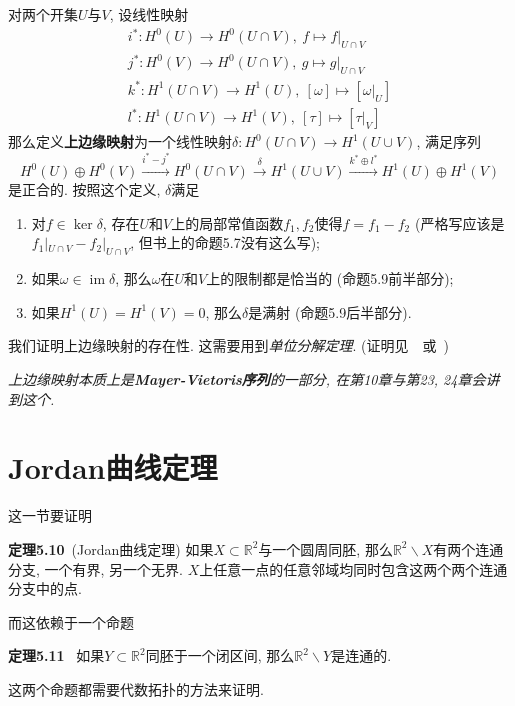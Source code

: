 \documentclass[11pt]{article}
\theoremstyle{definition}\newtheorem*{analyse}{分析}
\theoremstyle{remark}\newtheorem{rem*}{评注}
\newenvironment{env}[1]{\par\vspace{1em}\noindent\textbf{#1}\ }{\par\vspace{1em}}
\DeclareMathOperator{\im}{im}
\begin{document}
对两个开集$U$与$V$, 设线性映射
\begin{gather*}
    i^*:H^0(U)\to H^0(U\cap V),\ f\mapsto f|_{U\cap V}\\
    j^*:H^0(V)\to H^0(U\cap V),\ g\mapsto g|_{U\cap V}\\
    k^*:H^1(U\cap V)\to H^1(U),\ [\omega]\mapsto[\omega|_U]\\
    l^*:H^1(U\cap V)\to H^1(V),\ [\tau]\mapsto[\tau|_V]
\end{gather*}
那么定义\textbf{上边缘映射}为一个线性映射$\delta:H^0(U\cap V)\to H^1(U\cup V)$, 满足序列
\begin{equation}
    H^0(U)\oplus H^0(V)\xrightarrow{i^*-j^*}H^0(U\cap V)\xrightarrow{\delta}H^1(U\cup V)\xrightarrow{k^*\oplus l^*}H^1(U)\oplus H^1(V)
    \label{mayer-vietoris}
\end{equation}
是正合的.
按照这个定义, $\delta$满足
\begin{enumerate}
    \item 对$f\in\ker\delta$, 存在$U$和$V$上的局部常值函数$f_1,f_2$使得$f=f_1-f_2$ (严格写应该是$f_1|_{U\cap V}-f_2|_{U\cap V}$, 但书上的命题5.7没有这么写);
    \item 如果$\omega\in\im\delta$, 那么$\omega$在$U$和$V$上的限制都是恰当的 (命题5.9前半部分);
    \item 如果$H^1(U)=H^1(V)=0$, 那么$\delta$是满射 (命题5.9后半部分).
\end{enumerate}

我们证明上边缘映射的存在性.
这需要用到\textit{单位分解定理}.
(证明见~\cite[附录B2]{Fulton1995}~或~\cite[pp.\ 63--64]{Spivak1965})

\vskip 12cm

{\it 上边缘映射本质上是\textbf{Mayer-Vietoris序列}的一部分, 在第10章与第23, 24章会讲到这个.}

\section{Jordan曲线定理}
这一节要证明
\begin{env}{定理5.10}(Jordan曲线定理)
    如果$X\subset\mathbb{R}^2$与一个圆周同胚, 那么$\mathbb{R}^2\backslash X$有两个连通分支, 一个有界, 另一个无界.
    $X$上任意一点的任意邻域均同时包含这两个两个连通分支中的点.
\end{env}
\noindent 而这依赖于一个命题
\begin{env}{定理5.11}
    如果$Y\subset\mathbb{R}^2$同胚于一个闭区间, 那么$\mathbb{R}^2\backslash Y$是连通的.
\end{env}
\noindent 这两个命题都需要代数拓扑的方法来证明.
\vskip 14cm
\end{document}
